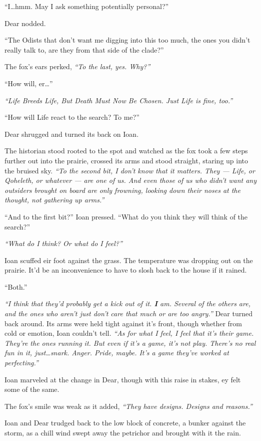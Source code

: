 ``I\ldots{}hmm. May I ask something potentially personal?''

Dear nodded.

``The Odists that don't want me digging into this too much, the ones you didn't really talk to, are they from that side of the clade?''

The fox's ears perked, \emph{``To the last, yes. Why?''}

``How will, er\ldots{}''

\emph{``Life Breeds Life, But Death Must Now Be Chosen. Just Life is fine, too.''}

``How will Life react to the search? To me?''

Dear shrugged and turned its back on Ioan.

The historian stood rooted to the spot and watched as the fox took a few steps further out into the prairie, crossed its arms and stood straight, staring up into the bruised sky. \emph{``To the second bit, I don't know that it matters. They — Life, or Qoheleth, or whatever — are one of us. And even those of us who didn't want any outsiders brought on board are only frowning, looking down their noses at the thought, not gathering up arms.''}

``And to the first bit?'' Ioan pressed. ``What do you think they will think of the search?''

\emph{``What do I think? Or what do I feel?''}

Ioan scuffed eir foot against the grass. The temperature was dropping out on the prairie. It'd be an inconvenience to have to slosh back to the house if it rained.

``Both.''

\emph{``I think that they'd probably get a kick out of it. \textbf{I} am. Several of the others are, and the ones who aren't just don't care that much or are too angry.''} Dear turned back around. Its arms were held tight against it's front, though whether from cold or emotion, Ioan couldn't tell. \emph{``As for what I feel, I feel that it's their game. They're the ones running it. But even if it's a game, it's not play. There's no real fun in it, just\ldots{}snark. Anger. Pride, maybe. It's a game they've worked at perfecting.''}

Ioan marveled at the change in Dear, though with this raise in stakes, ey felt some of the same.

The fox's smile was weak as it added, \emph{``They have designs. Designs and reasons.''}

Ioan and Dear trudged back to the low block of concrete, a bunker against the storm, as a chill wind swept away the petrichor and brought with it the rain.
